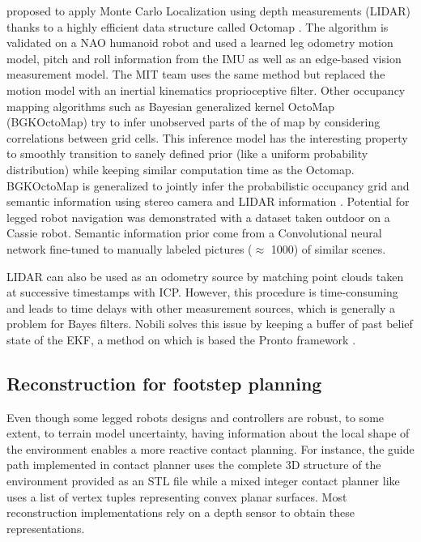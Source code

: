 \cite{hornung2014monte} proposed to apply Monte Carlo Localization using depth measurements (LIDAR) thanks to a highly efficient data structure called Octomap \cite{hornung2013octomap}.
The algorithm is validated on a NAO humanoid robot and used a learned leg odometry motion model, pitch and roll information from the IMU as well as an edge-based vision measurement model.
The MIT team \cite{fallon2014drift} uses the same method but replaced the motion model with an inertial kinematics proprioceptive filter. Other occupancy mapping algorithms 
such as Bayesian generalized kernel OctoMap (BGKOctoMap) \cite{doherty2017bayesian} try to infer unobserved parts of the of map by considering correlations between grid cells. This inference model
has the interesting property to smoothly transition to sanely defined prior (like a uniform probability distribution) while keeping similar computation time as the Octomap.
BGKOctoMap is generalized to jointly infer the probabilistic occupancy grid and semantic information using stereo camera and LIDAR information \cite{gan2020bayesian}. 
Potential for legged robot navigation was demonstrated with a dataset taken outdoor on a Cassie robot.  
Semantic information prior come from a Convolutional neural network fine-tuned to manually labeled pictures ($\approx$ 1000) of similar scenes.


LIDAR can also be used as an odometry source by matching point clouds taken at successive timestamps with ICP. However, this procedure is time-consuming 
and leads to time delays with other measurement sources, which is generally a problem for Bayes filters. 
Nobili \cite{nobili2017heterogeneous} solves this issue by keeping a buffer of past belief state of the EKF, a method on which is 
based the Pronto framework \cite{camurri2020pronto}.




\subsection{Reconstruction for footstep planning}
Even though some legged robots designs and controllers \cite{reher2019dynamic, bledt2018cheetah} are robust, to some extent, to terrain model uncertainty, having information about the local
shape of the environment enables a more reactive contact planning. For instance, the guide path implemented in contact planner \cite{tonneau2018efficient} uses the complete 3D structure of the environment
provided as an STL file while a mixed integer contact planner like \cite{tonneau2020sl1m} uses a list of vertex tuples representing convex planar surfaces.
Most reconstruction implementations rely on a depth sensor to obtain these representations.

